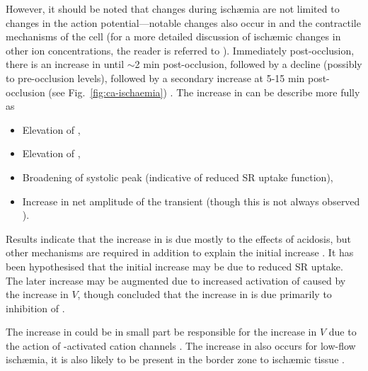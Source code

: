 \documentclass[../thesis-main.tex]{subfiles}
\begin{document}
 However, it should be noted that changes during isch\ae{}mia are not limited to changes in the action potential---notable changes also occur in \cai{} and the contractile mechanisms of the cell (for a more detailed discussion of isch\ae{}mic changes in other ion concentrations, the reader is referred to \citet{Niederer2013}). Immediately post-occlusion, there is an increase in \cai{} until $\sim$2 min post-occlusion, followed by a decline (possibly to pre-occlusion levels), followed by a secondary increase at 5-15 min post-occlusion (see Fig.~\ref{fig:ca-ischaemia}) \citep{Lee1988, Mohabir1991, Camacho1993}. The increase in \cai{} can be describe more fully as
 \begin{itemize}
  \item Elevation of \casys{},
  \item Elevation of \cadia{},
  \item Broadening of systolic \ca{} peak (indicative of reduced SR uptake function),
  \item Increase in net amplitude of the \ca{} transient (though this is not always observed \citep{Camacho1993}).
 \end{itemize}
 Results indicate that the increase in \cai{} is due mostly to the effects of acidosis, but other mechanisms are required in addition to explain the initial increase \citep{Bers1982, Mohabir1991}. It has been hypothesised that the initial increase may be due to reduced SR uptake. The later increase may be augmented due to increased activation of \ica{} caused by the increase in $V$, though \citet{Niederer2013} concluded that the increase in \cadia{} is due primarily to inhibition of \inak{}.
 
 The increase in \cai{} could be in small part be responsible for the increase in $V$ due to the action of \ca{}-activated cation channels \citep{Colquhoun1981}. The increase in \cai{} also occurs for low-flow isch\ae{}mia, \idest{} it is also likely to be present in the border zone to isch\ae{}mic tissue \citep{Camacho1993}.
 
\end{document}
